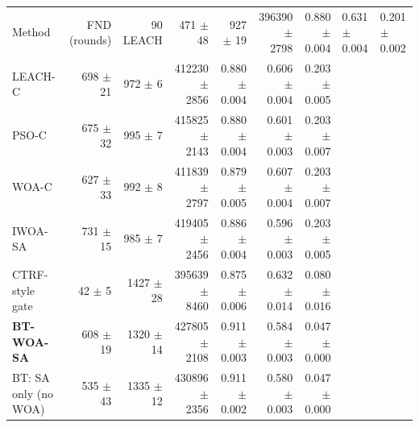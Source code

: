 \begin{tabular}{lrrrrrr}
\toprule
Method & FND (rounds) & 90 %
\midrule
LEACH & 471 $\pm$ 48 & 927 $\pm$ 19 & 396390 $\pm$ 2798 & 0.880 $\pm$ 0.004 & 0.631 $\pm$ 0.004 & 0.201 $\pm$ 0.002 \\
LEACH-C & 698 $\pm$ 21 & 972 $\pm$ 6 & 412230 $\pm$ 2856 & 0.880 $\pm$ 0.004 & 0.606 $\pm$ 0.004 & 0.203 $\pm$ 0.005 \\
PSO-C & 675 $\pm$ 32 & 995 $\pm$ 7 & 415825 $\pm$ 2143 & 0.880 $\pm$ 0.004 & 0.601 $\pm$ 0.003 & 0.203 $\pm$ 0.007 \\
WOA-C & 627 $\pm$ 33 & 992 $\pm$ 8 & 411839 $\pm$ 2797 & 0.879 $\pm$ 0.005 & 0.607 $\pm$ 0.004 & 0.203 $\pm$ 0.007 \\
IWOA-SA & 731 $\pm$ 15 & 985 $\pm$ 7 & 419405 $\pm$ 2456 & 0.886 $\pm$ 0.004 & 0.596 $\pm$ 0.003 & 0.203 $\pm$ 0.005 \\
CTRF-style gate & 42 $\pm$ 5 & 1427 $\pm$ 28 & 395639 $\pm$ 8460 & 0.875 $\pm$ 0.006 & 0.632 $\pm$ 0.014 & 0.080 $\pm$ 0.016 \\
\textbf{BT-WOA-SA} & 608 $\pm$ 19 & 1320 $\pm$ 14 & 427805 $\pm$ 2108 & 0.911 $\pm$ 0.003 & 0.584 $\pm$ 0.003 & 0.047 $\pm$ 0.000 \\
BT: SA only (no WOA) & 535 $\pm$ 43 & 1335 $\pm$ 12 & 430896 $\pm$ 2356 & 0.911 $\pm$ 0.002 & 0.580 $\pm$ 0.003 & 0.047 $\pm$ 0.000 \\
\bottomrule
\end{tabular}